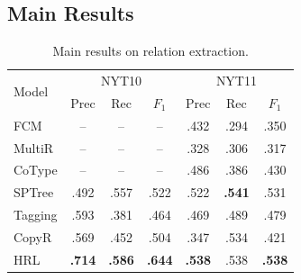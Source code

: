 \documentclass[letterpaper]{article} %
\theoremstyle{definition}
\begin{document}
\subsection{Main Results}

\begin{table}[!htb]
    \centering
    \begin{tabular}{lcccccc}%
    \toprule
        \multirow{2}{*}{Model} & \multicolumn{3}{c}{NYT10 
        } & \multicolumn{3}{c}{NYT11}\\ %
         & Prec & Rec & $F_1$ & Prec & Rec & $F_1$\\ %
    \midrule
        FCM & -- & -- & -- & .432 & .294 & .350 \\%
        MultiR & -- & -- & -- & .328 & .306 & .317 \\%
        CoType & -- & -- & -- & .486 & .386 & .430 \\%
        SPTree & .492 & .557 & .522 & .522 & \textbf{.541} & .531 \\%
        Tagging & .593 & .381 & .464 & .469 & .489 & .479 \\%
        CopyR & .569 & .452 & .504 & .347 & .534 & .421 \\
    \midrule
        HRL & \textbf{.714} & \textbf{.586} & \textbf{.644} & \textbf{.538} & .538 & \textbf{.538} \\%
    \bottomrule
    \end{tabular}
    \caption{Main results on relation extraction.}
    \label{main}
\end{table}
\end{document}
